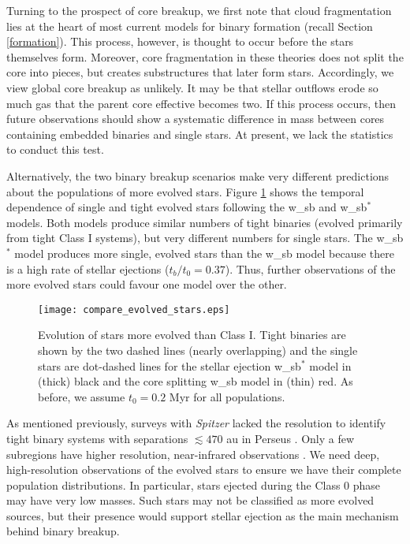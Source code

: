 \documentclass[usenatbib,a4paper]{mnras}
\newcommand{\tOI}{\mbox{$t_{0}$}} %
\begin{document}
Turning to the prospect of core breakup, we first note that cloud fragmentation lies at the heart of most current models for binary formation (recall Section \ref{formation}).  This process, however, is thought to occur before the stars themselves form.   Moreover, core fragmentation in these theories does not split the core into pieces, but creates substructures that later form stars.  Accordingly, we view global core breakup as unlikely.  It may be that stellar outflows erode so much gas that the parent core effective becomes two.  If this process occurs, then future observations should show a systematic difference in mass between cores containing embedded binaries and single stars.  At present, we lack the statistics to conduct this test.

Alternatively, the two binary breakup scenarios make very different predictions about the populations of more evolved stars.  Figure \ref{evolved_fig} shows the temporal dependence of single and tight evolved stars following the w\_sb and w\_sb$^{\ast}$ models.   Both models produce similar numbers of tight binaries (evolved primarily from tight Class I systems), but very different numbers for single stars.  The w\_sb$^{\ast}$ model produces more single, evolved stars than the w\_sb model because there is a high rate of stellar ejections ($t_b/\tOI = 0.37$).  Thus, further observations of the more evolved stars could favour one model over the other.

\begin{figure}
\texttt{[image: compare\_evolved\_stars.eps]}
\caption{Evolution of stars more evolved than Class I.  Tight binaries are shown by the two dashed lines (nearly overlapping) and the single stars are dot-dashed lines for the stellar ejection w\_sb$^{\ast}$ model in (thick) black and the core splitting w\_sb model in (thin) red.   As before, we assume $\tOI = 0.2$ Myr for all populations.   \label{evolved_fig}}
\end{figure}

As mentioned previously, surveys with \emph{Spitzer} lacked the resolution to identify tight binary systems with separations $\lesssim 470$ au in Perseus \citep{Cieza09}.  Only a few subregions have higher resolution, near-infrared observations \citep[e.g., IC 348; ][]{Duchene99}.  We need deep, high-resolution observations of the evolved stars to ensure we have their complete population distributions.  In particular, stars ejected during the Class 0 phase may have very low masses.  Such stars may not be classified as more evolved sources, but their presence would support stellar ejection as the main mechanism behind binary breakup.
\end{document}
